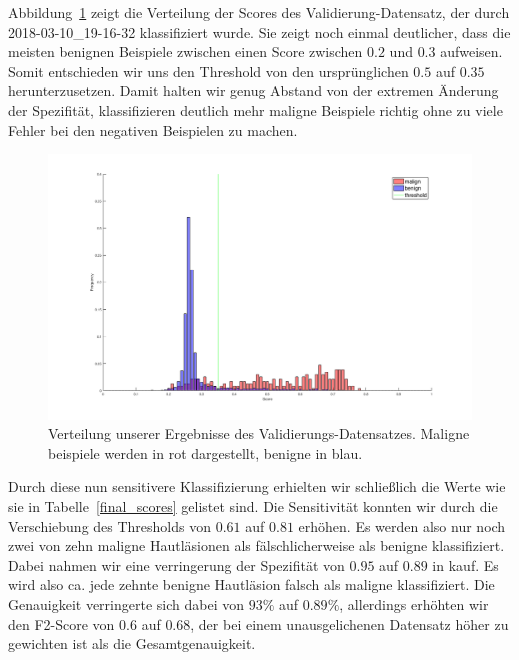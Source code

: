 Abbildung~\ref{fig:verteilung} zeigt die Verteilung der Scores des Validierung-Datensatz, der durch 2018-03-10\_19-16-32 klassifiziert wurde. Sie zeigt noch einmal deutlicher, dass die meisten benignen Beispiele zwischen einen Score zwischen $0.2$ und $0.3$ aufweisen. Somit entschieden wir uns den Threshold von den ursprünglichen $0.5$ auf $0.35$ herunterzusetzen. Damit halten wir genug Abstand von der extremen Änderung der Spezifität, klassifizieren deutlich mehr maligne Beispiele richtig ohne zu viele Fehler bei den negativen Beispielen zu machen. 

\begin{figure}[htb!]
	\begin{center}
		\includegraphics[width=\textwidth]{./pics/threshold/score_threshold.png}
		\caption{Verteilung unserer Ergebnisse des Validierungs-Datensatzes. Maligne beispiele werden in rot dargestellt, benigne in blau.}
		\label{fig:verteilung}
    \end{center}
\end{figure}


Durch diese nun sensitivere Klassifizierung erhielten wir schließlich die Werte wie sie in Tabelle~\ref{final_scores} gelistet sind. Die Sensitivität konnten wir durch die Verschiebung des Thresholds von $0.61$ auf $0.81$ erhöhen. Es werden also nur noch zwei von zehn maligne Hautläsionen als fälschlicherweise als benigne klassifiziert. Dabei nahmen wir eine verringerung der Spezifität von $0.95$ auf $0.89$ in kauf. Es wird also ca. jede zehnte benigne Hautläsion falsch als maligne klassifiziert. Die Genauigkeit verringerte sich dabei von $93\%$ auf $0.89\%$, allerdings erhöhten wir den F2-Score von $0.6$ auf $0.68$, der bei einem unausgelichenen Datensatz höher zu gewichten ist als die Gesamtgenauigkeit.

